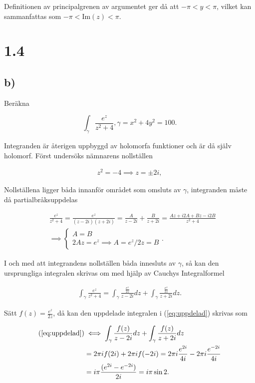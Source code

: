 \documentclass[a4paper]{article}
\begin{document}
Definitionen av principalgrenen av argumentet ger då att $-\pi < y < \pi$, vilket kan sammanfattas som $-\pi < \text{Im}(z) < \pi$.

\section*{1.4}
\subsection*{b)}

Beräkna

\begin{equation*}
	\int_\gamma \frac{e^z}{z^2 + 4}, \gamma = x^2 + 4y^2 = 100.
\end{equation*}

Integranden är återigen uppbyggd av holomorfa funktioner och är då själv holomorf. Först undersöks nämnarens nollställen

\begin{align*}
	z^2 = -4 \implies z = \pm 2i,
\end{align*}

Nollställena ligger båda innanför området som omsluts av $\gamma$, integranden måste då partialbråksuppdelas

\begin{align*}
	&\frac{e^z}{z^2 + 4} = \frac{e^z}{(z-2i)(z+2i)} = \frac{A}{z-2i} + \frac{B}{z+2i} = \frac{Az + i2A + Bz - i2B}{z^2 + 4}\\
	&\implies	\begin{cases}
					A = B\\
					2Az = e^z \implies A = e^z/2z = B
				\end{cases}.
\end{align*}

I och med att integrandens nollställen båda innesluts av $\gamma$, så kan den ursprungliga integralen skrivas om med hjälp av Cauchys Integralformel

\begin{align}
	\int_\gamma \frac{e^z}{z^2 + 4} = \int_\gamma \frac{\frac{e^z}{2z}}{z-2i}dz + \int_\gamma \frac{\frac{e^z}{2z}}{z+2i}dz.\label{eq:uppdelad}
\end{align}

Sätt $f(z) = \frac{e^z}{2z}$, då kan den uppdelade integralen i (\ref{eq:uppdelad}) skrivas som

\begin{align*}
	(\ref{eq:uppdelad}) &\iff \int_\gamma \frac{f(z)}{z-2i}dz + \int_\gamma \frac{f(z)}{z+2i}dz\\
		&= 2\pi i f(2i) + 2\pi i f(-2i) = 2\pi i \frac{e^{2i}}{4i} - 2\pi i \frac{e^{-2i}}{4i}\\
		&= i\pi\frac{(e^{2i} - e^{-2i})}{2i} = i\pi\sin 2.
\end{align*}
\end{document}
